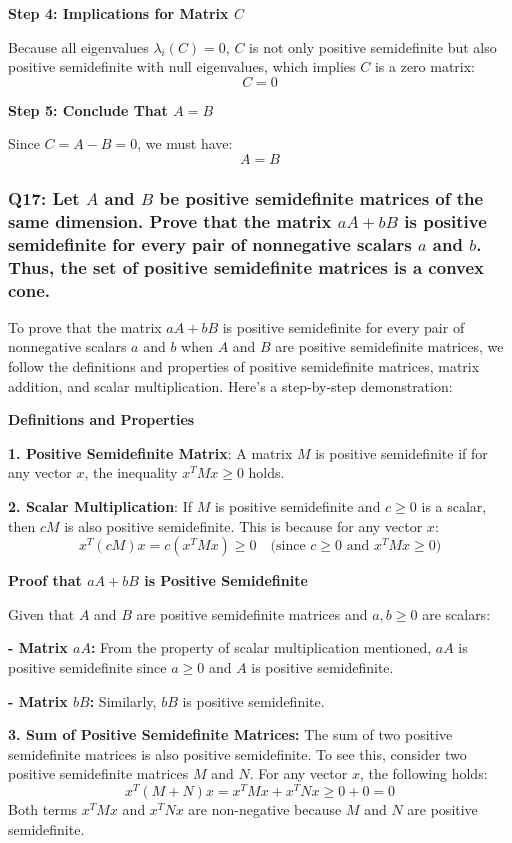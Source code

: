 \documentclass[8pt]{article}
\begin{document}
{{\textbf{Step 4: Implications for Matrix \(C\)}

Because all eigenvalues \(\lambda_i(C) = 0\), \(C\) is not only positive semidefinite but also positive semidefinite with null eigenvalues, which implies \(C\) is a zero matrix:
\[
C = 0
\]

\textbf{Step 5: Conclude That \(A = B\)}

Since \(C = A - B = 0\), we must have:
\[
A = B
\]


\subsubsection*{Q17: Let \(A\) and \(B\) be positive semidefinite matrices of the same dimension. Prove that the matrix \(aA + bB\) is positive semidefinite for every pair of nonnegative scalars \(a\) and \(b\). Thus, the set of positive semidefinite matrices is a convex cone.}

To prove that the matrix \(aA + bB\) is positive semidefinite for every pair of nonnegative scalars \(a\) and \(b\) when \(A\) and \(B\) are positive semidefinite matrices, we follow the definitions and properties of positive semidefinite matrices, matrix addition, and scalar multiplication. Here's a step-by-step demonstration:

\textbf{Definitions and Properties}

\textbf{1. Positive Semidefinite Matrix}:
   A matrix \(M\) is positive semidefinite if for any vector \(x\), the inequality \(x^T M x \geq 0\) holds.

\textbf{2. Scalar Multiplication}:
   If \(M\) is positive semidefinite and \(c \geq 0\) is a scalar, then \(cM\) is also positive semidefinite. This is because for any vector \(x\):
   \[
   x^T (cM) x = c(x^T M x) \geq 0 \quad \text{(since \(c \geq 0\) and \(x^T M x \geq 0\))}
   \]

\textbf{Proof that \(aA + bB\) is Positive Semidefinite}

Given that \(A\) and \(B\) are positive semidefinite matrices and \(a, b \geq 0\) are scalars:

\textbf{- Matrix \(aA\):} From the property of scalar multiplication mentioned, \(aA\) is positive semidefinite since \(a \geq 0\) and \(A\) is positive semidefinite.

\textbf{- Matrix \(bB\):} Similarly, \(bB\) is positive semidefinite.

\textbf{3. Sum of Positive Semidefinite Matrices:}
   The sum of two positive semidefinite matrices is also positive semidefinite. To see this, consider two positive semidefinite matrices \(M\) and \(N\). For any vector \(x\), the following holds:
   \[
   x^T (M + N) x = x^T M x + x^T N x \geq 0 + 0 = 0
   \]
   Both terms \(x^T M x\) and \(x^T N x\) are non-negative because \(M\) and \(N\) are positive semidefinite.

}}
\end{document}
